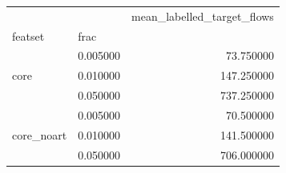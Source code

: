 \begin{tabular}{llr}
\toprule
 &  & mean_labelled_target_flows \\
featset & frac &  \\
\midrule
\multirow[t]{3}{*}{core} & 0.005000 & 73.750000 \\
 & 0.010000 & 147.250000 \\
 & 0.050000 & 737.250000 \\
\cline{1-3}
\multirow[t]{3}{*}{core_noart} & 0.005000 & 70.500000 \\
 & 0.010000 & 141.500000 \\
 & 0.050000 & 706.000000 \\
\cline{1-3}
\bottomrule
\end{tabular}
